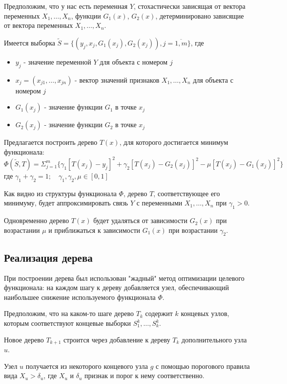\documentclass{article}
\begin{document}
Предположим, что у нас есть переменная $Y$, стохастически зависящая от вектора переменных $X_1, \dots, X_n$, 
функции $G_1(x)$, $G_2(x)$, детерминировано зависящие от вектора переменных $X_1, \dots, X_n$.

Имеется выборка $\tilde{S} = \{ (y_j, x_j, G_1(x_j), G_2(x_j)), j = \overline{1, m} \}$, где
\begin{itemize}
	\item $y_j$ - значение переменной $Y$ для объекта с номером $j$
	\item $x_j = (x_{j1}, \dots, x_{jn})$ - вектор значений признаков $X_1, \dots, X_n$ для объекта с номером $j$
	\item $G_1(x_j)$ - значение функции $G_1$ в точке $x_j$
	\item $G_2(x_j)$ - значение функции $G_2$ в точке $x_j$
\end{itemize}

Предлагается построить дерево $T(x)$, для которого достигается минимум функционала:
$$ \Phi(\tilde{S}, T) = \Sigma_{j=1}^{m} \{ \gamma_1 [T(x_j) - y_j]^2 + \gamma_2 [T(x_j) - G_2(x_j)]^2 - \mu [T(x_j) - G_1(x_j)]^2   \}  $$
где $\gamma_1 + \gamma_2 = 1; \quad \gamma_1, \gamma_2, \mu \in [0, 1] $


Как видно из структуры функционала $\Phi$, дерево $T$, соответствующее его минимуму,  будет аппроксимировать связь $Y$ с переменными $X_1, \dots, X_n$ при $\gamma_1 > 0$.

Одновременно дерево $T(x)$ будет удаляться от зависимости $G_2(x)$ при возрастании $\mu$ и приближаться к зависимости $G_1(x)$ при возрастании $\gamma_2$.


\subsection{Реализация дерева}

При построении дерева был использован "жадный" \space метод оптимизации целевого функционала: на каждом шагу к дереву добавляется узел, обеспечивающий наибольшее снижение используемого функционала $\Phi$.

Предположим, что на каком-то шаге дерево $T_k$ содержит $k$ концевых узлов, которым соответствуют концевые выборки $S_1^k, \dots, S_k^k$.

Новое дерево $T_{k + 1}$ строится через добавление к дереву $T_k$ дополнительного узла $u$.

Узел $u$ получается из некоторого концевого узла $g$ с помощью порогового правила вида $X_u > \delta_u$, где $X_u$ и $\delta_u$ признак и порог к нему соответственно. 
\end{document}
